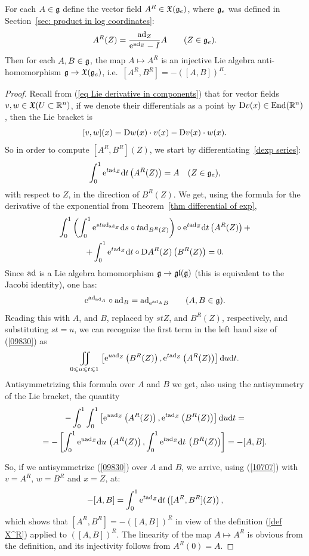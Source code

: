 \begin{lem}[{{\cite[Lem.~1.8.2]{DK}}}]
    For each $A\in\mathfrak{g}$ define the vector field $A^R\in \mathfrak{X}(\mathfrak{g}_e)$, where $\mathfrak{g}_e$ was defined in Section~\ref{sec: product in log coordinates}:
    \[ A^R(Z)=\frac{\mathrm{ad}_Z}{\mathrm{e}^{\mathrm{ad}_Z}-I}A\quad \quad (Z\in\mathfrak{g}_e). \label{def X^R}\]
    Then for each $A,B\in\mathfrak{g}$, the map $A\mapsto A^R$ is an injective Lie algebra anti-homomorphism $\mathfrak{g}\to \mathfrak{X}(\mathfrak{g}_e)$, i.e.\ $[A^R,B^R]=-([A,B])^R$.
\end{lem}
\begin{proof}
    Recall from (\ref{eq Lie derivative in components}) that for vector fields $v,w\in\mathfrak{X}(U\subset\mathbb{R}^n)$, if we denote their differentials as a point by $\mathrm{D} v(x)\in \operatorname{End}(\mathbb{R}^n)$, then the Lie bracket is
    \[[v,w](x)=\mathrm{D} w(x)\cdot v(x)-\mathrm{D} v(x)\cdot w(x).\label{10707}\]
    So in order to compute $[A^R,B^R](Z)$, we start by differentiating~\ref{dexp series}:
    \[\int_0^1 \mathrm{e}^{t\mathrm{ad}_Z}{\mathrm{d}} t \left(A^R(Z)\right)=A\quad (Z\in\mathfrak{g}_e),\]
    with respect to $Z$, in the direction of $B^R(Z)$. We get, using the formula for the derivative of the exponential from Theorem~\ref{thm differential of exp}, 
    \begin{multline}
        \int_0^1 \left(\int_0^1\mathrm{e}^{st\mathrm{ad}_{\mathrm{ad}_Z}} {\mathrm{d}} s\circ t\mathrm{ad}_{B^R(Z)}\right)\circ \mathrm{e}^{t\mathrm{ad}_Z}{\mathrm{d}} t\left(A^R(Z)\right)+\\
        +\int_0^1\mathrm{e}^{t\mathrm{ad}_Z}{\mathrm{d}} t\circ \mathrm{D} A^R(Z)\left(B^R(Z)\right)=0.\label{09830}
    \end{multline} 
    Since $\mathrm{ad}$ is a Lie algebra homomorphism $\mathfrak{g}\to\mathfrak{gl}(\mathfrak{g})$ (this is equivalent to the Jacobi identity), one has:
    \[\mathrm{e}^{\mathrm{ad}_{\mathrm{ad}_A}}\circ \mathrm{ad}_B=\mathrm{ad}_{\mathrm{e}^{\mathrm{ad}_A} B}\quad \quad (A,B\in\mathfrak{g}).\]
    Reading this with $A$, and $B$, replaced by $stZ$, and $B^R(Z)$, respectively, and substituting $st=u$, we can recognize the first term in the left hand size of (\ref{09830}) as
    \[\iint_{0\leqslant u\leqslant t\leqslant 1}\left[\mathrm{e}^{u\mathrm{ad}_Z}\left(B^R(Z)\right),\mathrm{e}^{t\mathrm{ad}_Z}\left(A^R(Z)\right)\right]{\mathrm{d}} u{\mathrm{d}} t.\]
    Antisymmetrizing this formula over $A$ and $B$  we get, also using the antisymmetry of the Lie bracket, the quantity
    \begin{multline}
        -\int_0^1\int_0^1\left[\mathrm{e}^{u\mathrm{ad}_Z}\left(A^R(Z)\right),\mathrm{e}^{t\mathrm{ad}_Z}\left(B^R(Z)\right)\right]{\mathrm{d}} u{\mathrm{d}} t=\\
        =-\left[\int_0^1\mathrm{e}^{u\mathrm{ad}_Z}{\mathrm{d}} u\, \left(A^R(Z)\right),\int_0^1\mathrm{e}^{t\mathrm{ad}_Z}{\mathrm{d}} t\, \left(B^R(Z)\right)\right]=-[A,B].
    \end{multline}

    So, if we antisymmetrize (\ref{09830}) over $A$ and $B$, we arrive, using (\ref{10707}) with $v=A^R$, $w=B^R$ and $x=Z$, at:
    \[-[A,B]=\int_0^1 \mathrm{e}^{t\mathrm{ad}_Z}{\mathrm{d}} t\left([A^R,B^R](Z)\right),\]
    which shows that $[A^R,B^R]=-([A,B])^R$ in view of the definition (\ref{def X^R}) applied to $([A,B])^R$. The linearity of the map $A\mapsto A^R$ is obvious from the definition, and its injectivity follows from $A^R(0)=A$.
\end{proof}
